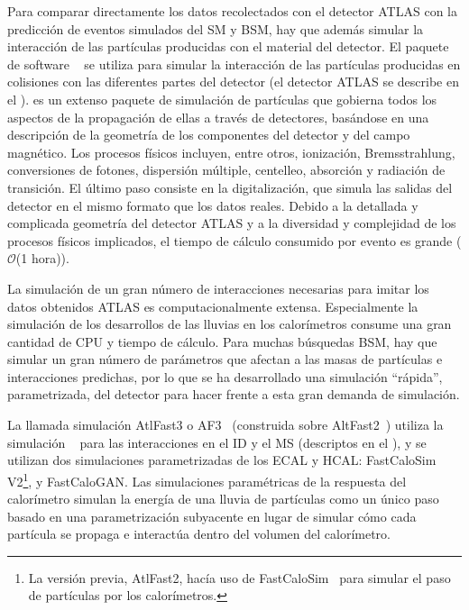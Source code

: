 Para comparar directamente los datos recolectados con el detector \ac{ATLAS} con la predicción de eventos simulados del \ac{SM} y \ac{BSM}, hay que adem\'as simular la interacción de las partículas producidas con el material del detector.
El paquete de software \GEANT~\cite{Geant4} se utiliza para simular la interacción de las partículas producidas en colisiones \pp  con las diferentes partes del detector (el detector \ac{ATLAS} se describe en el \Ch{\ref{ch:atlas}}). \GEANT es un extenso paquete de simulación de partículas que gobierna todos los aspectos de la propagación de ellas a través de detectores, basándose en una descripción de la geometría de los componentes del detector y del campo magnético. Los procesos físicos incluyen, entre otros, ionización, Bremsstrahlung, conversiones de fotones, dispersión múltiple, centelleo, absorción y radiación de transición. El último paso consiste en la digitalización, que simula las salidas del detector en el mismo formato que los datos reales. Debido a la detallada y complicada geometría del detector \ac{ATLAS} y a la diversidad y complejidad de los procesos físicos implicados, el tiempo de cálculo consumido por evento es grande (\(\mathcal{O}\)(1 hora)).

La simulación de un gran número de interacciones necesarias para imitar los datos obtenidos \ac{ATLAS} es computacionalmente extensa. Especialmente la simulación de los desarrollos de las lluvias en los calorímetros consume una gran cantidad de CPU y tiempo de cálculo. Para muchas búsquedas \ac{BSM}, hay que simular un gran número de parámetros que afectan a las masas de partículas e interacciones predichas, por lo que se ha desarrollado una simulación \enquote{rápida}, parametrizada, del detector para hacer frente a esta gran demanda de simulación.

La llamada simulación AtlFast3 o AF3~\cite{ATLAS-AF3} (construida sobre AltFast2~\cite{ATLAS-AF2}) utiliza la simulación \GEANT~\cite{Geant4} para las interacciones en el \ac{ID} y el \ac{MS} (descriptos en el \Ch{\ref{ch:atlas}}), y se utilizan dos simulaciones parametrizadas de los \ac{ECAL} y \ac{HCAL}: FastCaloSim V2\footnote{La versi\'on previa, AtlFast2, hac\'ia uso de FastCaloSim~\cite{ATLAS-FastCaloSim} para simular el paso de partículas por los calorímetros.}, y FastCaloGAN.
Las simulaciones paramétricas de la respuesta del calorímetro simulan la energía de una lluvia de partículas como un único paso basado en una parametrización subyacente en lugar de simular cómo cada partícula se propaga e interactúa dentro del volumen del calorímetro.

